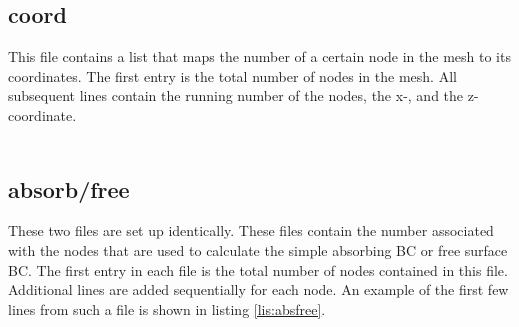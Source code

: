     	\subsection{coord}
    	\label{subsec:coord}
    	
    		This file contains a list that maps the number of a certain node in the mesh to its coordinates. The first entry is the total number of nodes in the mesh. All subsequent lines contain the running number of the nodes, the x-, and the z-coordinate. \\
    		\\
    	\subsection{absorb/free}
    	\label{subsec:absfree}
    		 
    		These two files are set up identically. These files contain the number associated with the nodes that are used to calculate the simple absorbing BC or free surface BC. The first entry in each file is the total number of nodes contained in this file. Additional lines are added sequentially for each node. An example of the first few lines from such a file is shown in listing \ref{lis:absfree}.

